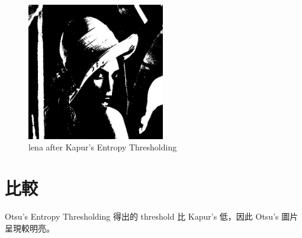 \documentclass[conference]{IEEEtran}
\begin{document}
\begin{figure}[H]
\centerline{\includegraphics[width=6cm]{kapur.jpg}}
\caption{lena after Kapur’s Entropy Thresholding}
\label{origin}
\end{figure}

\section{比較}
Otsu's Entropy Thresholding 得出的 threshold 比 Kapur's 低，因此 Otsu's 圖片呈現較明亮。


\vspace{12pt}
\end{document}
